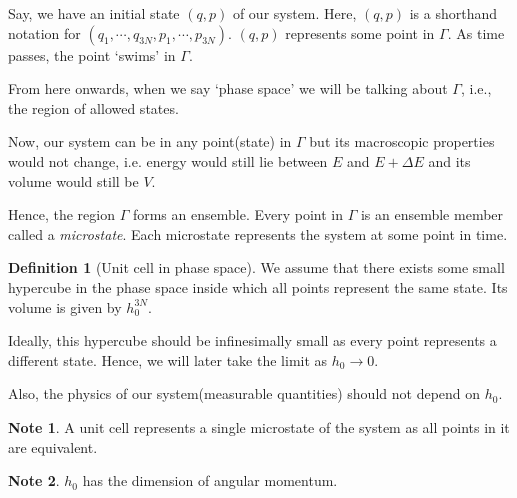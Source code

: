 \documentclass[10pt, a4paper]{extarticle}
\theoremstyle{definition}
\newtheorem{defn}{Definition}
\newtheorem*{note*}{Note}
\begin{document}
Say, we have an initial state $(q,p)$ of our system. Here, $(q,p)$ is a shorthand notation for $(q_1,\cdots,q_{3N},p_1,\cdots,p_{3N})$. $(q,p)$ represents some point in $\Gamma$. As time passes, the point `swims' in $\Gamma$. 

From here onwards, when we say `phase space' we will be talking about $\Gamma$, i.e., the region of allowed states.

Now, our system can be in any point(state) in $\Gamma$ but its macroscopic properties would not change, i.e. energy would still lie between $E$ and $E+\Delta E$ and its volume would still be $V$.

Hence, the region $\Gamma$ forms an ensemble. Every point in $\Gamma$ is an ensemble member called a \emph{microstate}. Each microstate represents the system at some point in time.

\begin{defn}[Unit cell in phase space]
	We assume that there exists some small hypercube in the phase space inside which all points represent the same state. Its volume is given by $h_0^{3N}$.

	Ideally, this hypercube should be infinesimally small as every point represents a different state. Hence, we will later take the limit as $h_0\to 0$.

	Also, the physics of our system(measurable quantities) should not depend on $h_0$.
\end{defn}
\begin{note*}
	A unit cell represents a single microstate of the system as all points in it are equivalent.
\end{note*}
\begin{note*}
	$h_0$ has the dimension of angular momentum.
\end{note*}
\end{document}
